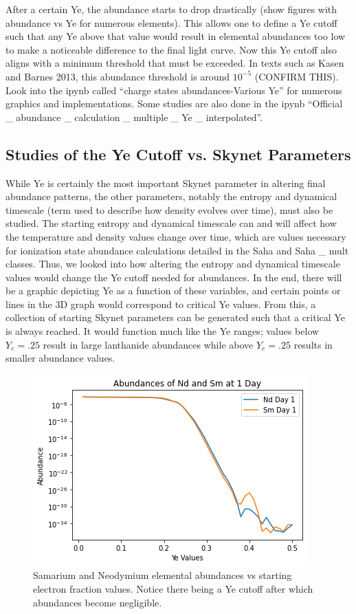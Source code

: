 \documentclass[11pt,a4paper]{article}
\begin{document}
After a certain Ye, the abundance starts to drop drastically (show figures with abundance vs Ye for numerous elements). This allows one to define a Ye cutoff such that any Ye above that value would result in elemental abundances too low to make a noticeable difference to the final light curve. Now this Ye cutoff also aligns with a minimum threshold that must be exceeded. In texts such as Kasen and Barnes 2013, this abundance threshold is around $10^{-5}$ (CONFIRM THIS).  
Look into the ipynb called “charge states abundances-Various Ye” for numerous graphics and implementations. Some studies are also done in the ipynb “Official \_ abundance \_ calculation \_ multiple \_ Ye \_ interpolated”. 


\subsection{Studies of the Ye Cutoff vs. Skynet Parameters}

While Ye is certainly the most important Skynet parameter in altering final abundance patterns, the other parameters, notably the entropy and dynamical timescale (term used to describe how density evolves over time), must also be studied. The starting entropy and dynamical timescale can and will affect how the temperature and density values change over time, which are values necessary for ionization state abundance calculations detailed in the Saha and Saha \_ mult classes. 
Thus, we looked into how altering the entropy and dynamical timescale values would change the Ye cutoff needed for abundances. In the end, there will be a graphic depicting Ye as a function of these variables, and certain points or lines in the 3D graph would correspond to critical Ye values. From this, a collection of starting Skynet parameters can be generated such that a critical Ye is always reached. It would function much like the Ye ranges; values below $Y_e=.25$ result in large lanthanide abundances while above $Y_e=.25$ results in smaller abundance values. 


\begin{figure}[h!]
  \includegraphics[scale = .75]{sm_nd_day1.png}
  \centering
  \caption{Samarium and Neodymium elemental abundances vs starting electron fraction values. Notice there being a Ye cutoff after which abundances become negligible.}
\end{figure} 
\end{document}
